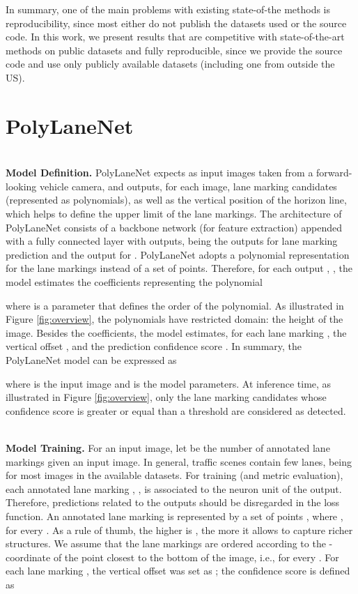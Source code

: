 \documentclass[a4paper,conference]{IEEEtran}
\newcommand{\methodname}{PolyLaneNet}
\begin{document}
In summary, one of the main problems with existing state-of-the methods is reproducibility, since most either do not publish the datasets used or the source code. In this work, we present results that are competitive with state-of-the-art methods on public datasets and fully reproducible, since we provide the source code and use only publicly available datasets (including one from outside the US).

 \section{\methodname}



\noindent\\
\textbf{Model Definition.} \methodname{} expects as input images taken from a forward-looking vehicle camera, and outputs, for each image,  lane marking candidates (represented as polynomials), as well as the vertical position  of the horizon line, which helps to define the upper limit of the lane markings. The architecture of \methodname{} consists of a backbone network (for feature extraction) appended with a fully connected layer with  outputs, being the outputs  for lane marking prediction and the output  for . \methodname{} adopts a polynomial representation for the lane markings instead of a set of points. Therefore, 
for each output , , the model estimates the coefficients  representing the polynomial


where  is a parameter that defines the order of the polynomial. As illustrated in Figure \ref{fig:overview}, the polynomials have restricted domain: the height of the image. Besides the coefficients, the model estimates, for each lane marking , the vertical offset , and the prediction confidence score . In summary, the \methodname{} model can be expressed as


where  is the input image and  is the model parameters. At inference time, as illustrated in Figure \ref{fig:overview}, only the lane marking candidates whose confidence score is greater or equal than a threshold are considered as detected.


\noindent\\
\textbf{Model Training.}
For an input image, let  be the number of annotated lane markings given an input image. In general, traffic scenes contain few lanes, being  for most images in the available datasets. For training (and metric evaluation), each annotated lane marking , , is associated to the neuron unit  of the output. Therefore, predictions related to the outputs  should be disregarded in the loss function. An annotated lane marking  is represented by a set of points , where , for every . As a rule of thumb, the higher is , the more it allows to capture richer structures. We assume that the lane markings  are ordered according to the -coordinate of the point closest to the bottom of the image, i.e.,  for every . For each lane marking , the vertical offset  was set as ; the confidence score is defined as
\end{document}
